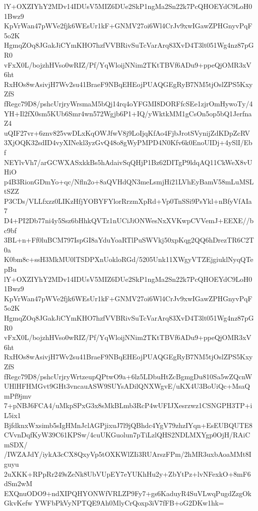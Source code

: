 lY+OXZIYhY2MDv14IDUsV5MIZ6DUe2SkP1ngMa2Sn22k7PcQHOEYdC9LoH01Bwz9
KpVrWan47pWVe2fjk6WEsUr1kF+GNMV27oi6Wl4CrJv9xwIGawZPHGnyvPqF5o2K
HgmqZOq8JGakJiCYmKHO7hzfVVBRivSuTcVarArq83XvD4T3lt051Wg4nz87pGR0
vFxX0L/bojzhHVso0wRIZ/Pf/YqWloijNNim2TKtTBVf6ADu9+ppeQjOMR3xV6ht
RxHOs8wAsivjH7Wv2su41BraeF9NBqEHEojPUAQGEgRyB7NM5tjOslZPS5KxyZfS
fRegc79D8/pshcUrjryWrsmaM5bQj14rq4oYFGMI8DORFfcSEe1zjrOmHywoTy/4
YH+Il2fX0sm5KUb6Smr4wn572Wgjb6P1+IQ/yWktkMM1gCsOn5op5bQ1JerfnaZ4
uQIF27vr+6znv825vwDLxKqOWJfwV8j9LoIjqKfAo4FjbJrotSVynijZdKDpZcRV
3XjOQK32sdID4vyXINekl3yzGvQ48o8gWyPMPD4N0Kfv6k0EnoUIDj+4ySlI/Ebf
NEYlvVh7/arGCWXASxkkBs5hAdaivSqQHjP1Bz62DITgP9ldqAQ11CkWeX8vUHiO
p4B3RionGDmYo+qc/Nfln2o+8aQVHdQN3meLsmjHi21LVhEyBamV58mLuMSLtSZZ
P3CDs/VLLfxzz0LIKzHfjYOBYFYlorRrzmXpRd+Vp0TnSSi9PsYkl+nBfyVfAIa7
D4+PI2Db77ni4y5Ssz6bHhkQVTz1nUCiJiONWesNxXVKwpCVVemJ+EEXE//bc9bf
3BL+n+Ff0luBCM797IspGI8aYduYoaRTlPuSWVkj50xpKqg2QQ6hDrezTR6C2T0a
K0bm8c+ssH3MkMU0lTSDPXnUokloRGd/5205Unk11XWgyVTZEjgiuklNyqQTepBu
lY+OXZIYhY2MDv14IDUsV5MIZ6DUe2SkP1ngMa2Sn22k7PcQHOEYdC9LoH01Bwz9
KpVrWan47pWVe2fjk6WEsUr1kF+GNMV27oi6Wl4CrJv9xwIGawZPHGnyvPqF5o2K
HgmqZOq8JGakJiCYmKHO7hzfVVBRivSuTcVarArq83XvD4T3lt051Wg4nz87pGR0
vFxX0L/bojzhHVso0wRIZ/Pf/YqWloijNNim2TKtTBVf6ADu9+ppeQjOMR3xV6ht
RxHOs8wAsivjH7Wv2su41BraeF9NBqEHEojPUAQGEgRyB7NM5tjOslZPS5KxyZfS
fRegc79D8/pshcUrjryWrtzeupQPtwO9a+6lz5LDbuHtZcBgmgDu810Sa5wZQcnW
UHlHFHMGvt9GHt3vncauASW9SUYsADilQNXWgvE/uKX4U3BoUiQc+MsaQmPf9jmv
7+pNBJ6FCA4/uMkpSPxG3x8sMkBLmb3RcP4wUFIJXesrzwz1CSNGPH3TP+iL5ix1
BjfdknxWxsimb5sIgHMnJclAGPjixuJ7l9jQBhdc4YgV79zhzIYqn+EsEUBQUTE8
CVvnDqfKyW39C61KPSw/4cuUKGuolun7pTiLzlQHS2NDLMXYgp0OjH/RAiCmSDX/
/IWZAJdY/iykA3cCX8QxyVp5tOXKWlZIi3RUArszFPm/2hMR3uxbAoaMMt8Iguyu
2uXKK+RPpRr249sZeNk8UbVUpEY7eYUKhHu2y+ZbYtPz+lvNFexkO+8mF6dSm2wM
EXQnuODO9+ndXIPQHYONWfVRLZP9Fy7+gs6KaduyR4SuVLwqPugdZzgOkGkvKefw
YWFbPkVyNPTQE9Ah0MlyCrQoxp3iV7fFB+oG2DKw1hk=
